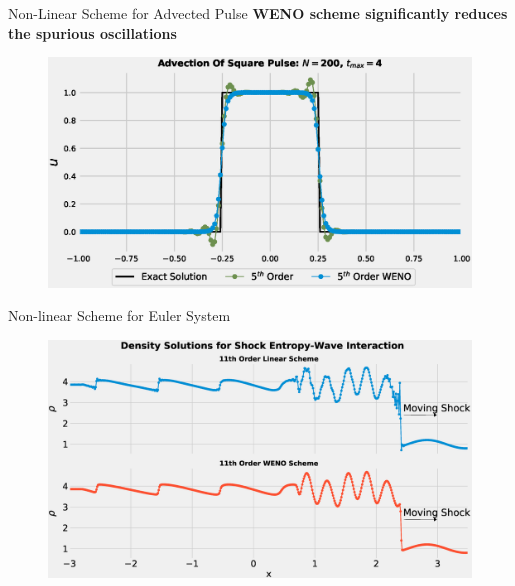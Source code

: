 \documentclass[10pt]{beamer}
\begin{document}
\begin{frame}{Non-Linear Scheme for Advected Pulse}
  \centering
  \textbf{WENO scheme significantly reduces the spurious oscillations}
  \begin{figure}[H]
    \centering
    \includegraphics[scale=0.55]{AdvectionHighOrderComparison_pulseWENO.eps}
    \end{figure}
\end{frame}

\begin{frame}{Non-linear Scheme for Euler System}
  \begin{figure}[H]
    \centering
    \includegraphics[scale=0.275]{ShockEntropyComparison.eps}
    \end{figure}
\end{frame}
\end{document}
